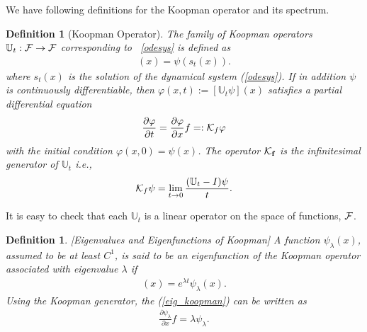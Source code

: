 \documentclass[11pt]{article}
\theoremstyle{plain}
\newtheorem{definition}[theorem]{Definition}
\newcommand{\cK}{{\cal K}}
\newcommand{\cF}{{\cal F}}
\newcommand{\mR}{{\mathbb R}}
\newcommand{\mU}{{\mathbb U}}
\newcommand{\bff}{{\mathbf f}}
\def\[{\begin{equation}}
\def\]{\end{equation}}
\begin{document}
We have following definitions for the Koopman operator and its spectrum. 
\begin{definition}[Koopman Operator] The family of Koopman  operators $\mathbb{U}_t:\cF\to \cF$ corresponding to ~\eqref{odesys} is defined as 
\begin{eqnarray}[\mathbb{U}_t \psi](x)=\psi(s_t(x)). \label{koopman_operator}
\end{eqnarray}
where $s_t(x)$ is the solution of the dynamical system (\ref{odesys}). 
If in addition $\psi$ is continuously differentiable, then $\varphi(x,t):=[\mU_t \psi ](x)$ satisfies a partial differential equation \cite{Lasota} 
\begin{align}
\frac{\partial \varphi}{\partial t}=\frac{\partial \varphi}{\partial x} f=: \cK_f \varphi \label{Koopmanpde}
\end{align}
with the initial condition $\varphi(x,0)=\psi(x)$. The operator $\cK_\bff$ is the infinitesimal generator of $\mU_t$ i.e.,
\begin{eqnarray}
{\cal K}_{f} \psi=\lim_{t\to 0}\frac{(\mathbb{U}_t-I)\psi}{t}. \label{K_generator}
\end{eqnarray}
\end{definition}
It is easy to check that each $\mU_t$ is a linear operator on the space of functions, $\cF$.  
\begin{definition}\label{definition_koopmanspectrum}[Eigenvalues and Eigenfunctions of Koopman] A function $\psi_\lambda(x)$, assumed to be at least $C^1$,  is said to be an eigenfunction of the Koopman operator associated with eigenvalue $\lambda$ if
\begin{eqnarray}
[\mU_t \psi_\lambda](x)=e^{\lambda t}\psi_\lambda(x)\label{eig_koopman}.
\end{eqnarray}
Using the Koopman generator, the (\ref{eig_koopman}) can be written as 
\begin{align}
    \frac{\partial \psi_\lambda}{\partial x}{f}=\lambda \psi_\lambda\label{eig_koopmang}.
\end{align}
\end{definition}
\end{document}
